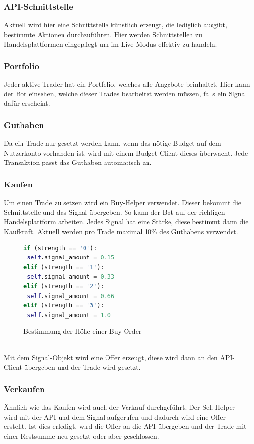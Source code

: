 \subsubsection{API-Schnittstelle}
Aktuell wird hier eine Schnittstelle künstlich erzeugt, die lediglich ausgibt, bestimmte Aktionen durchzuführen. Hier werden Schnittstellen zu Handelsplattformen eingepflegt um im Live-Modus effektiv zu handeln.
\subsubsection{Portfolio}
Jeder aktive Trader hat ein Portfolio, welches alle Angebote beinhaltet. Hier kann der Bot einsehen, welche dieser Trades bearbeitet werden müssen, falls ein Signal dafür erscheint.
\subsubsection{Guthaben}
Da ein Trade nur gesetzt werden kann, wenn das nötige Budget auf dem Nutzerkonto vorhanden ist, wird mit einem Budget-Client dieses überwacht. Jede Transaktion passt das Guthaben automatisch an.
\subsubsection{Kaufen}
Um einen Trade zu setzen wird ein Buy-Helper verwendet. Dieser bekommt die Schnittstelle und das Signal übergeben. So kann der Bot auf der richtigen Handelsplattform arbeiten. Jedes Signal hat eine Stärke, diese bestimmt dann die Kaufkraft. Aktuell werden pro Trade maximal 10\% des Guthabens verwendet. 
\begin{figure}[ht]
\begin{lstlisting}[language=Python]
if (strength == '0'):
 self.signal_amount = 0.15
elif (strength == '1'):
 self.signal_amount = 0.33
elif (strength == '2'):
 self.signal_amount = 0.66
elif (strength == '3'):
 self.signal_amount = 1.0
\end{lstlisting}
\caption{Bestimmung der Höhe einer Buy-Order}
\end{figure}
\\Mit dem Signal-Objekt wird eine Offer erzeugt, diese wird dann an den API-Client übergeben und der Trade wird gesetzt.
\subsubsection{Verkaufen}
Ähnlich wie das Kaufen wird auch der Verkauf durchgeführt. Der Sell-Helper wird mit der API und dem Signal aufgerufen und dadurch wird eine Offer erstellt. Ist dies erledigt, wird die Offer an die API übergeben und der Trade mit einer Restsumme neu gesetzt oder aber geschlossen.

